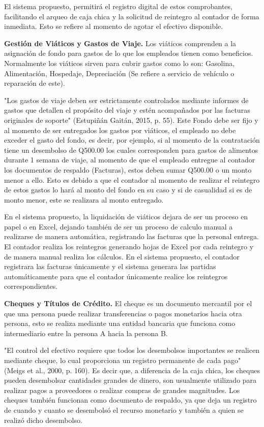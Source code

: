 El sistema propuesto, permitirá el registro digital de estos comprobantes, facilitando el arqueo de caja chica y la solicitud de reintegro al contador de forma inmediata. Esto se refiere al momento de agotar el efectivo disponible.

\textbf{Gestión de Viáticos y Gastos de Viaje.} Los viáticos comprenden a la asignación de fondo para gastos de lo que los empleados tienen como beneficios. Normalmente los viáticos sirven para cubrir gastos como lo son: Gasolina, Alimentación, Hospedaje, Depreciación (Se refiere a servicio de vehículo o reparación de este).

"Los gastos de viaje deben ser estrictamente controlados mediante informes de gastos que detallen el propósito del viaje y estén acompañados por las facturas originales de soporte" (Estupiñán Gaitán, 2015, p. 55). Este Fondo debe ser fijo y al momento de ser entregados los gastos por viáticos, el empleado no debe exceder el gasto del fondo, es decir, por ejemplo, si al momento de la contratación tiene un desembolso de Q500.00 los cuales corresponden para gastos de alimentos durante 1 semana de viaje, al momento de que el empleado entregue al contador los documentos de respaldo (Facturas), estos deben sumar Q500.00 o un monto menor a ello. Esto es debido a que el contador al momento de realizar el reintegro de estos gastos lo hará al monto del fondo en su caso y si de casualidad si es de monto menor, este se realizara al monto entregado.

En el sistema propuesto, la liquidación de viáticos dejara de ser un proceso en papel o en Excel, dejando también de ser un proceso de calculo manual a realizarse de manera automática, registrando las facturas que la personal entrega. El contador realiza los reintegros generando hojas de Excel por cada reintegro y de manera manual realiza los cálculos. En el sistema propuesto, el contador registrara las facturas únicamente y el sistema generara las partidas automáticamente para que el contador únicamente realice los reintegros correspondientes.

\textbf{Cheques y Títulos de Crédito.} El cheque es un documento mercantil por el que una persona puede realizar transferencias o pagos monetarios hacia otra persona, esto se realiza mediante una entidad bancaria que funciona como intermediario entre la persona A hacia la persona B.

"El control del efectivo requiere que todos los desembolsos importantes se realicen mediante cheque, lo cual proporciona un registro permanente de cada pago" (Meigs et al., 2000, p. 160). Es decir que, a diferencia de la caja chica, los cheques pueden desembolsar cantidades grandes de dinero, son usualmente utilizado para realizar pagos a proveedores o realizar compras de grandes magnitudes. Los cheques también funcionan como documento de respaldo, ya que deja un registro de cuando y cuanto se desembolsó el recurso monetario y también a quien se realizó dicho desembolso.

